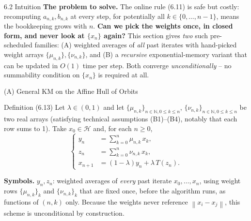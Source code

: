 \documentclass[aspectratio=169,10pt]{beamer}
\newcommand{\N}{\mathbb{N}}
\newcommand{\Hil}{\mathcal{H}}
\newcommand{\norm}[1]{\left\|#1\right\|}
\begin{document}
\begin{frame}{6.2 Intuition}
\textbf{The problem to solve.} The online rule (6.11) is safe but costly:
recomputing $a_{n,k},b_{n,k}$ at every step, for potentially all $k\in
\{0,\dots,n-1\}$, means the bookkeeping grows with $n$. \textbf{Can we
pick the weights once, in closed form, and never look at $\{x_n\}$
again?} This section gives \emph{two} such pre-scheduled families:
(A) weighted averages of \emph{all} past iterates with hand-picked
weight arrays $\{\mu_{n,k}\},\{\nu_{n,k}\}$, and (B) a \emph{recursive}
exponential-memory variant that can be updated in $O(1)$ time per step.
Both converge \emph{unconditionally} -- no summability condition on
$\{x_n\}$ is required at all.
\end{frame}

\begin{frame}{(A) General KM on the Affine Hull of Orbits}
\begin{block}{Definition (6.13)}
Let $\lambda\in(0,1)$ and let $\{\mu_{n,k}\}_{n\in\N,0\le k\le n}$,
$\{\nu_{n,k}\}_{n\in\N,0\le k\le n}$ be two real arrays (satisfying
technical assumptions (B1)--(B4), notably that each row sums to 1). Take
$x_0\in\Hil$ and, for each $n\ge0$,
\[
\left\{
\begin{aligned}
y_n &= \sum_{k=0}^n \mu_{n,k}\,x_k, \\
z_n &= \sum_{k=0}^n \nu_{n,k}\,x_k, \\
x_{n+1} &= (1-\lambda) y_n + \lambda\, T(z_n).
\end{aligned}
\right.
\]
\end{block}
\textbf{Symbols.} $y_n,z_n$: weighted averages of \emph{every} past iterate
$x_0,\dots,x_n$, using weight rows $\{\mu_{n,k}\}_k$ and $\{\nu_{n,k}\}_k$
that are fixed once, before the algorithm runs, as functions of $(n,k)$
only. Because the weights never reference $\norm{x_i-x_j}$, this scheme
is unconditional by construction.
\end{frame}
\end{document}
